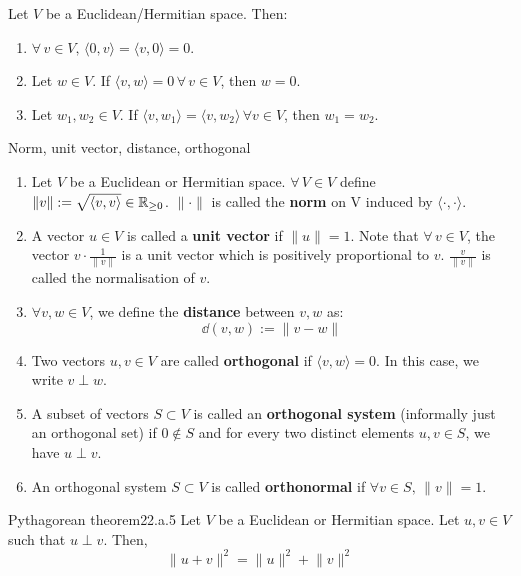 \documentclass[12pt]{article}
\begin{document}
\begin{lemma}{}{}
Let $V$ be a Euclidean/Hermitian space. Then:

\begin{enumerate}
    \item $\forall \, v \in V, \, \langle 0, v \rangle = \langle v, 0 \rangle = 0$.
    \item Let $w \in V$. If $\langle v, w \rangle = 0 \, \forall \, v \in V$, then $w = 0$.
    \item Let $w_1, w_2 \in V$. If $\langle v, w_1 \rangle = \langle v, w_2 \rangle \, \forall v \in V$, then $w_1 = w_2$.
\end{enumerate}
\end{lemma}

\begin{definition}{Norm, unit vector, distance, orthogonal}{}
\begin{enumerate}
    \item Let $V$ be a Euclidean or Hermitian space. $\forall \, V \in V$ define $\lVert v \rVert := \sqrt{\langle v, v \rangle} \in \mathbb{R}_{\geq 0}$. $\lVert \cdot \rVert$ is called the \textbf{norm} on V induced by $\langle \cdot, \cdot \rangle$.
    \item A vector $u \in V$ is called a \textbf{unit vector} if $\lVert u \rVert = 1$. Note that $\forall \, v \in V$, the vector $v \cdot \frac{1}{\lVert v \rVert}$ is a unit vector which is positively proportional to $v$. $\frac{v}{\lVert v \rVert}$ is called the normalisation of $v$. 
    \item $\forall v, w \in V$, we define the \textbf{distance} between $v, w$ as:
    $$
    \dd(v, w) := \lVert v - w \rVert
    $$
    \item Two vectors $u, v \in V$ are called \textbf{orthogonal} if $\langle v, w \rangle = 0$. In this case, we write $v \perp w$.
    \item A subset of vectors $S \subset V$ is called an \textbf{orthogonal system} (informally just an orthogonal set) if $0 \notin S$ and for every two distinct elements $u, v \in S$, we have $u \perp v$.
    \item An orthogonal system $S \subset V$ is called \textbf{orthonormal} if $\forall v \in S, \, \lVert v \rVert = 1$.
\end{enumerate}
\end{definition}

\begin{theorem}{Pythagorean theorem}{22.a.5}
Let $V$ be a Euclidean or Hermitian space. Let $u, v \in V$ such that $u \perp v$. Then, 
$$
\lVert u + v \rVert^2 = \lVert u \rVert^2 + \lVert v \rVert^2
$$
\end{theorem}
\end{document}
